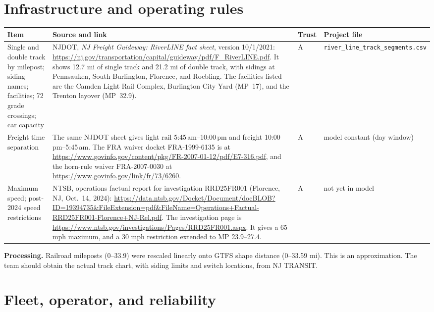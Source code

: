 \documentclass[11pt]{article}
\begin{document}
\section{Infrastructure and operating rules}\label{sec:infra}

\begin{longtable}{@{}p{3.3cm}p{7.8cm}p{1.0cm}p{2.6cm}@{}}
\toprule
Item & Source and link & Trust & Project file \\
\midrule
\endhead
Single and double track by milepost; siding names; facilities; 72 grade crossings; car capacity &
NJDOT, \emph{NJ Freight Guideway: RiverLINE fact sheet}, version 10/1/2021: \url{https://nj.gov/transportation/capital/guideway/pdf/F_RiverLINE.pdf}. It shows 12.7 mi of single track and 21.2 mi of double track, with sidings at Pennsauken, South Burlington, Florence, and Roebling. The facilities listed are the Camden Light Rail Complex, Burlington City Yard (MP~17), and the Trenton layover (MP~32.9). &
A & \nolinkurl{river_line_track_segments.csv} \\
Freight time separation &
The same NJDOT sheet gives light rail 5:45\,am--10:00\,pm and freight 10:00\,pm--5:45\,am. The FRA waiver docket FRA-1999-6135 is at \url{https://www.govinfo.gov/content/pkg/FR-2007-01-12/pdf/E7-316.pdf}, and the horn-rule waiver FRA-2007-0030 at \url{https://www.govinfo.gov/link/fr/73/6260}. &
A & model constant (day window) \\
Maximum speed; post-2024 speed restrictions &
NTSB, operations factual report for investigation RRD25FR001 (Florence, NJ, Oct.~14, 2024): \url{https://data.ntsb.gov/Docket/Document/docBLOB?ID=19394735&FileExtension=pdf&FileName=Operations+Factual-RRD25FR001-Florence+NJ-Rel.pdf}. The investigation page is \url{https://www.ntsb.gov/investigations/Pages/RRD25FR001.aspx}. It gives a 65 mph maximum, and a 30 mph restriction extended to MP 23.9--27.4. &
A & not yet in model \\
\bottomrule
\end{longtable}

\noindent\textbf{Processing.} Railroad mileposts (0--33.9) were rescaled linearly onto GTFS shape distance (0--33.59 mi). This is an approximation. The team should obtain the actual track chart, with siding limits and switch locations, from NJ TRANSIT.

\section{Fleet, operator, and reliability}
\end{document}
